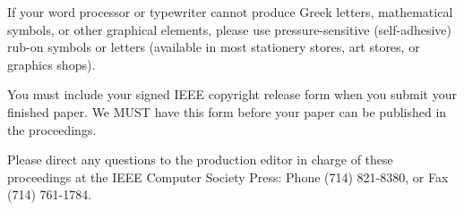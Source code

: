 \documentclass[times, 10pt,twocolumn]{article}
\begin{document}

If your word processor or typewriter cannot produce Greek letters, 
mathematical symbols, or other graphical elements, please use 
pressure-sensitive (self-adhesive) rub-on symbols or letters (available 
in most stationery stores, art stores, or graphics shops).


You must include your signed IEEE copyright release form when you submit 
your finished paper. We MUST have this form before your paper can be 
published in the proceedings.


Please direct any questions to the production editor in charge of these 
proceedings at the IEEE Computer Society Press: Phone (714) 821-8380, or 
Fax (714) 761-1784.

\nocite{ex1,ex2}


\end{document}
